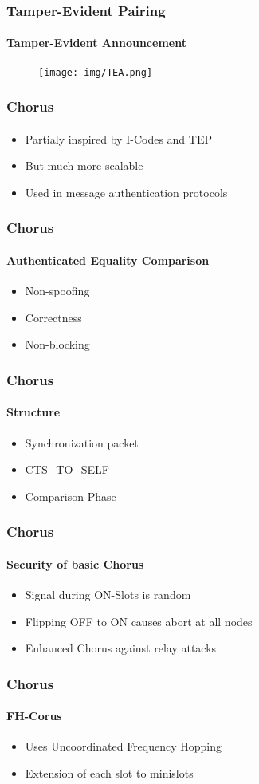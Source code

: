 \documentclass{beamer}
\begin{document}
\begin{frame}
	\frametitle{Tamper-Evident Pairing}
	\framesubtitle{Tamper-Evident Announcement}
	\begin{figure}
		\centering
		\texttt{[image: img/TEA.png]}
	\end{figure}
\end{frame}

\begin{frame}
	\frametitle{Chorus}
	\framesubtitle{}
	\begin{itemize}
		\item Partialy inspired by I-Codes and TEP
		\item But much more scalable
		\item Used in message authentication protocols 
	\end{itemize}
\end{frame}

\begin{frame}
	\frametitle{Chorus}
	\framesubtitle{Authenticated Equality Comparison}
	\begin{itemize}
		\item Non-spoofing 
		\item Correctness
		\item Non-blocking
	\end{itemize}
\end{frame}

\begin{frame}
	\frametitle{Chorus}
	\framesubtitle{Structure}
	\begin{itemize}
		\item Synchronization packet 
		\item CTS\_TO\_SELF
		\item Comparison Phase
	\end{itemize}
\end{frame}

\begin{frame}
	\frametitle{Chorus}
	\framesubtitle{Security of basic Chorus}
	\begin{itemize}
		\item Signal during ON-Slots is random
		\item Flipping OFF to ON causes abort at all nodes
		\item Enhanced Chorus against relay attacks 
	\end{itemize}
\end{frame}

\begin{frame}
	\frametitle{Chorus}
	\framesubtitle{FH-Corus}
	\begin{itemize}
		\item Uses Uncoordinated Frequency Hopping
		\item Extension of each slot to minislots 
	\end{itemize}
\end{frame}
\end{document}
